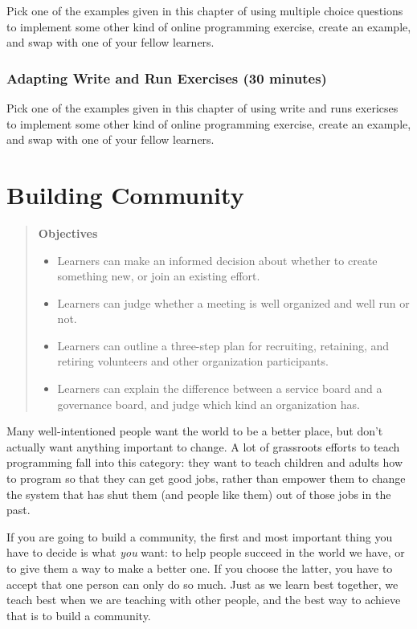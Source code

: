 \documentclass[10pt,statementpaper]{memoir}
\providecommand{\tightlist}{%
  \setlength{\itemsep}{0pt}\setlength{\parskip}{0pt}}
\begin{document}
Pick one of the examples given in this chapter of using multiple choice
questions to implement some other kind of online programming exercise,
create an example, and swap with one of your fellow learners.

\subsection{Adapting Write and Run Exercises (30
minutes)}\label{adapting-write-and-run-exercises-30-minutes}

Pick one of the examples given in this chapter of using write and runs
exericses to implement some other kind of online programming exercise,
create an example, and swap with one of your fellow learners.

\chapter{Building Community}\label{building-community}

\begin{quote}
\textbf{Objectives}

\begin{itemize}
\tightlist
\item
  Learners can make an informed decision about whether to create
  something new, or join an existing effort.
\item
  Learners can judge whether a meeting is well organized and well run or
  not.
\item
  Learners can outline a three-step plan for recruiting, retaining, and
  retiring volunteers and other organization participants.
\item
  Learners can explain the difference between a service board and a
  governance board, and judge which kind an organization has.
\end{itemize}
\end{quote}

Many well-intentioned people want the world to be a better place, but
don't actually want anything important to change. A lot of grassroots
efforts to teach programming fall into this category: they want to teach
children and adults how to program so that they can get good jobs,
rather than empower them to change the system that has shut them (and
people like them) out of those jobs in the past.

If you are going to build a community, the first and most important
thing you have to decide is what \emph{you} want: to help people succeed
in the world we have, or to give them a way to make a better one. If you
choose the latter, you have to accept that one person can only do so
much. Just as we learn best together, we teach best when we are teaching
with other people, and the best way to achieve that is to build a
community.
\end{document}
